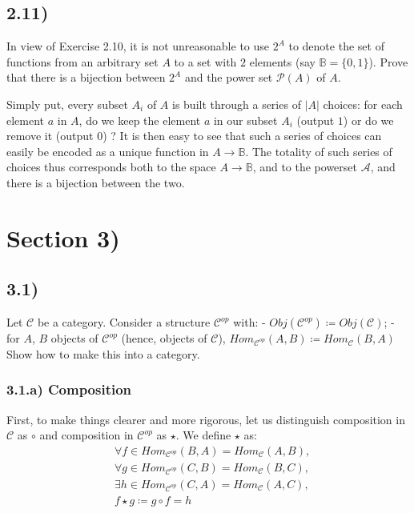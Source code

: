 \documentclass[12pt, letterpaper, twoside]{report}
\begin{document}
\subsection*{2.11)}

In view of Exercise 2.10, it is not unreasonable to use $2^A$ to denote the set of functions from an arbitrary set $A$ to a set with $2$ elements (say $\mathbb{B} = \{0, 1\}$). Prove that there is a bijection between $2^A$ and the power set $\mathcal{P}(A)$ of $A$.

Simply put, every subset $A_i$ of $A$ is built through a series of $|A|$ choices: for each element $a$ in $A$, do we keep the element $a$ in our subset $A_i$ (output $1$) or do we remove it (output $0$) ? It is then easy to see that such a series of choices can easily be encoded as a unique function in $A \to \mathbb{B}$. The totality of such series of choices thus corresponds both to the space $A \to \mathbb{B}$, and to the powerset $\mathcal{A}$, and there is a bijection between the two. 
\section*{Section 3)}

\subsection*{3.1)}

Let $\mathcal{C}$ be a category. Consider a structure $\mathcal{C}^{op}$ with:
 - $Obj(\mathcal{C}^{op}) \coloneqq Obj(\mathcal{C})$;
 - for $A$, $B$ objects of $\mathcal{C}^{op}$ (hence, objects of $\mathcal{C}$), $Hom_{\mathcal{C}^{op}} (A, B) \coloneqq Hom_{\mathcal{C}} (B, A)$
Show how to make this into a category.

\subsubsection*{3.1.a) Composition}

First, to make things clearer and more rigorous, let us distinguish composition in $\mathcal{C}$ as $\circ$ and composition in $\mathcal{C}^{op}$ as $\star$. We define $\star$ as:
$$
\begin{aligned}
	& \forall f \in Hom_{\mathcal{C}^{op}} (B, A) = Hom_{\mathcal{C}} (A, B), \\
	& \forall g \in Hom_{\mathcal{C}^{op}} (C, B) = Hom_{\mathcal{C}} (B, C), \\
	& \exists h \in Hom_{\mathcal{C}^{op}} (C, A) = Hom_{\mathcal{C}} (A, C), \\
	& f \star g \coloneqq g \circ f = h
\end{aligned}
$$
\end{document}
